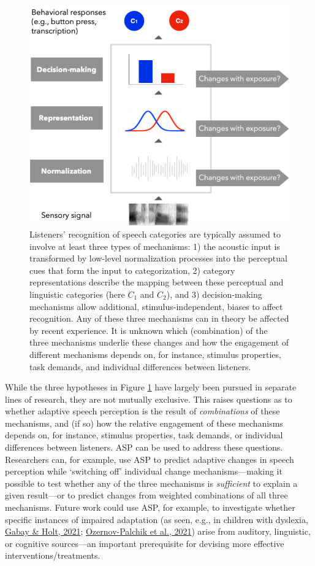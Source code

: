 \documentclass[
  11pt,
  english,
  man,floatsintext]{apa6}
\begin{document}
\begin{figure}[h]
\begin{center}
\includegraphics[width=0.6\columnwidth]{../figures/diagrams/overview-of-three-mechanisms.png}
\caption{Listeners' recognition of speech categories are typically assumed to involve at least three types of mechanisms: 1) the acoustic input is transformed by low-level normalization processes into the perceptual cues that form the input to categorization, 2) category representations describe the mapping between these perceptual and linguistic categories (here $C_1$ and $C_2$), and 3) decision-making mechanisms allow additional, stimulus-independent, biases to affect recognition. Any of these three mechanisms can in theory be affected by recent experience. It is unknown which (combination) of the three mechanisms underlie these changes and how the engagement of different mechanisms depends on, for instance, stimulus properties, task demands, and individual differences between listeners.}\label{fig:overview}
\end{center}
\end{figure}

While the three hypotheses in Figure \ref{fig:overview} have largely been pursued in separate lines of research, they are not mutually exclusive. This raises questions as to whether adaptive speech perception is the result of \emph{combinations} of these mechanisms, and (if so) how the relative engagement of these mechanisms depends on, for instance, stimulus properties, task demands, or individual differences between listeners. ASP can be used to address these questions. Researchers can, for example, use ASP to predict adaptive changes in speech perception while `switching off' individual change mechanisms---making it possible to test whether any of the three mechanisms is \emph{sufficient} to explain a given result---or to predict changes from weighted combinations of all three mechanisms. Future work could use ASP, for example, to investigate whether specific instances of impaired adaptation (as seen, e.g., in children with dyslexia, \protect\hyperlink{ref-gabay2021}{Gabay \& Holt, 2021}; \protect\hyperlink{ref-ozernov-palchik2021}{Ozernov-Palchik et al., 2021}) arise from auditory, linguistic, or cognitive sources---an important prerequisite for devising more effective interventions/treatments.
\end{document}
